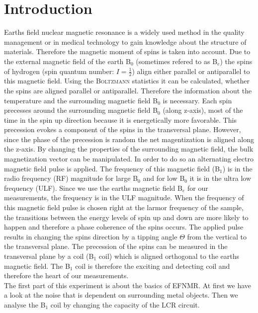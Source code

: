 \section{Introduction}
\label{sec:Introduction}
Earths field nuclear magnetic resonance is a widely used method in the quality management or in medical technology to gain knowledge about the structure of materials.
Therefore the magnetic moment of spins is taken into account.\newline
Due to the external magnetic field of the earth B$_0$ (sometimes refered to as B$_e$) the spins of hydrogen (spin quantum number: $I=\frac{1}{2}$) align either parallel or antiparallel to this magnetic field.
Using the \textsc{Boltzmann} statistics it can be calculated, whether the spins are aligned parallel or antiparallel.
Therefore the information about the temperature and the surrounding magnetic field B$_0$ is necessary.
Each spin precesses around the surrounding magnetic field B$_0$ (along z-axis), most of the time in the spin up direction because it is energetically more favorable.
This precession evokes a component of the spins in the transversal plane.
However, since the phase of the precession is random the net magentization is aligned along the z-axis.
By changing the properties of the surrounding magnetic field, the bulk magnetization vector can be manipulated.
In order to do so an alternating electro magnetic field pulse is applied.
The frequency of this magnetic field (B$_1$) is in the radio frequency (RF) magnitude for large B$_0$ and for low B$_0$ it is in the ultra low frequency (ULF).
Since we use the earths magnetic field B$_e$ for our measurements, the frequency is in the ULF magnitude.
When the frequency of this magnetic field pulse is chosen right at the larmor frequency of the sample, the transitions between the energy levels of spin up and down are more likely to happen and therefore a phase coherence of the spins occurs.
The applied pulse results in changing the spins direction by a tipping angle $\Theta$ from the vertical to the transversal plane.
The precession of the spins can be measured in the transversal plane by a coil (B$_1$ coil) which is aligned orthogonal to the earths magnetic field.
The B$_1$ coil is therefore the exciting and detecting coil and therefore the heart of our measurements. \\
The first part of this experiment is about the basics of EFNMR.
At first we have a look at the noise that is dependent on surrounding metal objects.
Then we analyse the B$_1$ coil by changing the capacity of the LCR circuit.
